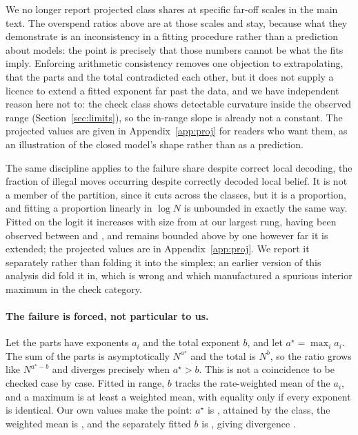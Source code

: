\documentclass[11pt]{article}
\begin{document}
We no longer report projected class shares at specific far-off scales in the main
text. The overspend ratios above are at those scales and stay, because what they
demonstrate is an inconsistency in a fitting procedure rather than a prediction about
models: the point is precisely that those numbers cannot be what the fits imply.
Enforcing
arithmetic consistency removes one objection to extrapolating, that the parts and the
total contradicted each other, but it does not supply a licence to extend a fitted
exponent far past the data, and we have independent reason here not to: the check
class shows detectable curvature inside the observed range (Section~\ref{sec:limits}),
so the in-range slope is already not a constant. The projected values are given in
Appendix~\ref{app:proj} for readers who want them, as an illustration of the closed
model's shape rather than as a prediction.

The same discipline applies to the failure share despite correct local decoding,
the fraction of illegal moves
occurring despite correctly decoded local belief. It is not a member of the
partition, since it cuts across the classes, but it is a proportion, and fitting a
proportion linearly in $\log N$ is unbounded in exactly the same way. Fitted on the
logit it increases with size from  at our largest rung, having been
observed between  and , and remains bounded above
by one however far it is extended; the projected values are in
Appendix~\ref{app:proj}. We report
it separately rather than folding it into the simplex; an earlier version of this
analysis did fold it in, which is wrong and which manufactured a spurious interior
maximum in the check category.

\paragraph{The failure is forced, not particular to us.}
Let the parts have exponents $a_i$ and the total exponent $b$, and let
$a^\star=\max_i a_i$. The sum of the parts is asymptotically $N^{a^\star}$ and the
total is $N^{b}$, so the ratio grows like $N^{a^\star-b}$ and diverges precisely
when $a^\star>b$. This is not a coincidence to be checked case by case. Fitted in
range, $b$ tracks the rate-weighted mean of the $a_i$, and a maximum is at least a
weighted mean, with equality only if every exponent is identical. Our own values
make the point: $a^\star$ is , attained by the  class,
the weighted mean is
, and the separately fitted $b$ is , giving
divergence .
\end{document}
